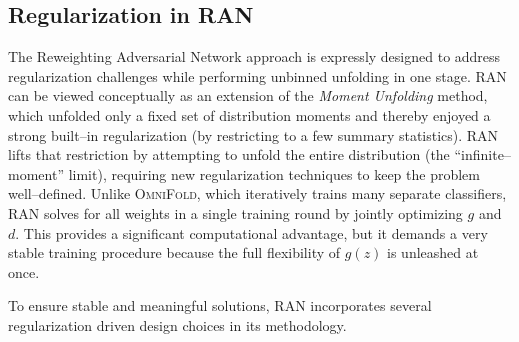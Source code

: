     \subsection{Regularization in RAN}
        The Reweighting Adversarial Network approach is expressly designed to address regularization challenges while performing unbinned unfolding in one stage.
        RAN can be viewed conceptually as an extension of the \emph{Moment Unfolding} method, which unfolded only a fixed set of distribution moments and thereby enjoyed a strong built--in regularization (by restricting to a few summary statistics).
        RAN lifts that restriction by attempting to unfold the entire distribution (the “infinite--moment” limit), requiring new regularization techniques to keep the problem well--defined.\kd{}
        Unlike \textsc{OmniFold}, which iteratively trains many separate classifiers, RAN solves for all weights in a single training round by jointly optimizing $g$ and $d$.
        This provides a significant computational advantage, but it demands a very stable training procedure because the full flexibility of $g(z)$ is unleashed at once.

        To ensure stable and meaningful solutions, RAN incorporates several regularization driven design choices in its methodology.
